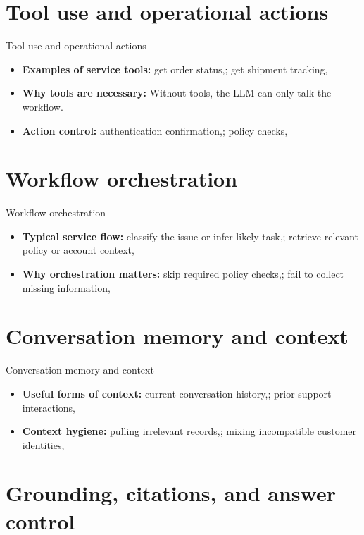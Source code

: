 \documentclass[aspectratio=169]{beamer}
\begin{document}
\section{Tool use and operational actions}

\begin{frame}{Tool use and operational actions}
  \begin{itemize}
    \item \textbf{Examples of service tools:} get order status,; get shipment tracking,
    \item \textbf{Why tools are necessary:} Without tools, the LLM can only talk the workflow.
    \item \textbf{Action control:} authentication confirmation,; policy checks,
  \end{itemize}
\end{frame}

\section{Workflow orchestration}

\begin{frame}{Workflow orchestration}
  \begin{itemize}
    \item \textbf{Typical service flow:} classify the issue or infer likely task,; retrieve relevant policy or account context,
    \item \textbf{Why orchestration matters:} skip required policy checks,; fail to collect missing information,
  \end{itemize}
\end{frame}

\section{Conversation memory and context}

\begin{frame}{Conversation memory and context}
  \begin{itemize}
    \item \textbf{Useful forms of context:} current conversation history,; prior support interactions,
    \item \textbf{Context hygiene:} pulling irrelevant records,; mixing incompatible customer identities,
  \end{itemize}
\end{frame}

\section{Grounding, citations, and answer control}
\end{document}
